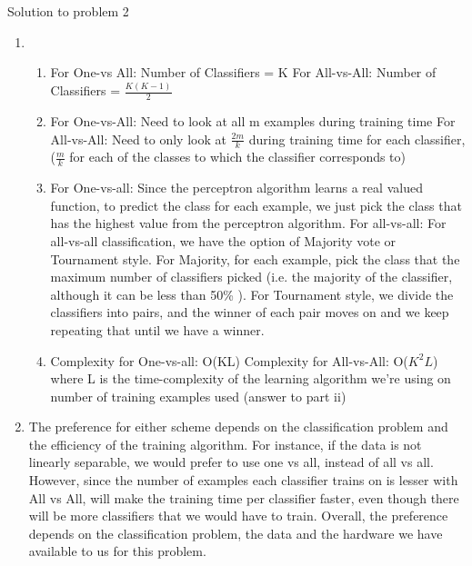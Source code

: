 \documentclass[11pt]{article}
\newcommand{\solution}[1]{{{\color{blue}{\bf Solution:} {#1}}}}
\begin{document}
\solution{Solution to problem 2}
\begin{enumerate}
\item 
	\begin{enumerate}
		\item 
			For One-vs All: Number of Classifiers = K \newline
			For All-vs-All: Number of Classifiers = $\frac{K(K-1)	}{2}$
		\item 
			For One-vs-All: Need to look at all m examples during training time \newline
			For All-vs-All: Need to only look at $\frac{2m}{k}$ during training time for
							 each classifier, ($\frac{m}{k}$ for each of the classes to 
							 which the classifier corresponds to) 
		\item
			For One-vs-all: Since the perceptron algorithm learns a real valued
			function, to predict the class for each example, we just pick the class
			that has the highest value from the perceptron algorithm. \newline
			For all-vs-all: For all-vs-all classification, we have the option of
			Majority vote or Tournament style. For Majority, for each example, pick the class that 				the maximum number of classifiers picked (i.e. the majority of the classifier, although 			it can be less than 50\% ). For Tournament style, we divide the classifiers into
			pairs, and the winner of each pair moves on and we keep repeating that until
			we have a winner.
		\item
			Complexity for One-vs-all: O(KL) \newline
			Complexity for All-vs-All: O($K^2L$) \newline
			where L is the time-complexity of the
			learning algorithm we're using on number of training examples used (answer to
			part ii)
	\end{enumerate}
\item 
The preference for either scheme depends on the classification problem and 
the efficiency of the training algorithm. For instance, if the data is not linearly
separable, we would prefer to use one vs all, instead of all vs all. However, since
the number of examples each classifier trains on is lesser with All vs All, will make
the training time per classifier faster, even though there will be more classifiers
that we would have to train. Overall, the preference depends on the classification 
problem, the data and the hardware we have available to us for this problem.


\end{enumerate}
\end{document}
